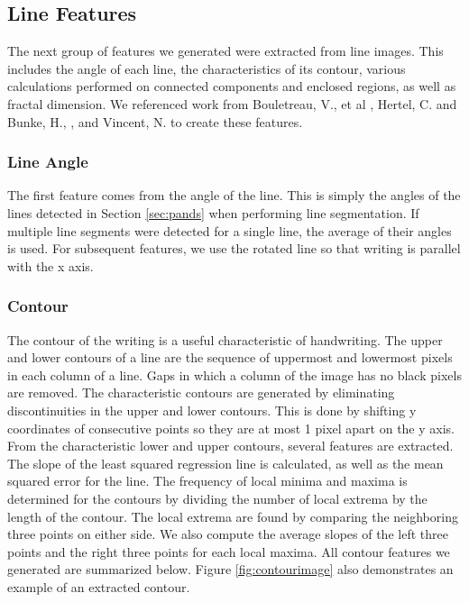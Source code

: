 \documentclass[paper=a4, fontsize=11pt]{scrartcl} %
\numberwithin{equation}{section} %
\numberwithin{figure}{section} %
\numberwithin{table}{section} %
\begin{document}
\subsection{Line Features}
The next group of features we generated were extracted from line
images. This includes the angle of each line, the characteristics of
its contour, various calculations performed on connected components
and enclosed regions, as well as fractal dimension. We referenced work
from Bouletreau, V., et al \cite{SyntheticParameters}, Hertel, C. and
Bunke, H., \cite{NovelFeatures}, and Vincent,
N. \cite{FractalDimensions} to create these features.

\subsubsection{Line Angle}
The first feature comes from the angle of the line. This is simply the
angles of the lines detected in Section \ref{sec:pands} when
performing line segmentation. If multiple line segments were detected
for a single line, the average of their angles is used. For subsequent
features, we use the rotated line so that writing is parallel with the
x axis.

\subsubsection{Contour}
The contour of the writing is a useful characteristic of
handwriting. The upper and lower contours of a line are the sequence
of uppermost and lowermost pixels in each column of a line. Gaps in
which a column of the image has no black pixels are removed. The
characteristic contours are generated by eliminating discontinuities
in the upper and lower contours. This is done by shifting y
coordinates of consecutive points so they are at most 1 pixel apart on
the y axis. From the characteristic lower and upper contours, several
features are extracted. The slope of the least squared regression line
is calculated, as well as the mean squared error for the line. The
frequency of local minima and maxima is determined for the contours by
dividing the number of local extrema by the length of the contour. The
local extrema are found by comparing the neighboring three points on
either side. We also compute the average slopes of the left three
points and the right three points for each local maxima. All contour
features we generated are summarized below. Figure
\ref{fig:contourimage} also demonstrates an example of an extracted
contour.
\end{document}
